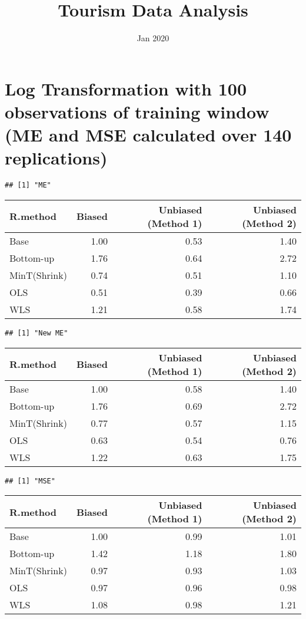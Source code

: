 \documentclass[
]{article}
\title{Tourism Data Analysis}
\author{}
\date{\vspace{-2.5em}Jan 2020}
\begin{document}
\maketitle

\hypertarget{log-transformation-with-100-observations-of-training-window-me-and-mse-calculated-over-140-replications}{%
\section{Log Transformation with 100 observations of training window (ME
and MSE calculated over 140
replications)}\label{log-transformation-with-100-observations-of-training-window-me-and-mse-calculated-over-140-replications}}

\begin{verbatim}
## [1] "ME"
\end{verbatim}

\begin{tabular}{l|r|r|r}
\hline
R.method & Biased & Unbiased (Method 1) & Unbiased (Method 2)\\
\hline
Base & 1.00 & 0.53 & 1.40\\
\hline
Bottom-up & 1.76 & 0.64 & 2.72\\
\hline
MinT(Shrink) & 0.74 & 0.51 & 1.10\\
\hline
OLS & 0.51 & 0.39 & 0.66\\
\hline
WLS & 1.21 & 0.58 & 1.74\\
\hline
\end{tabular}

\begin{verbatim}
## [1] "New ME"
\end{verbatim}

\begin{tabular}{l|r|r|r}
\hline
R.method & Biased & Unbiased (Method 1) & Unbiased (Method 2)\\
\hline
Base & 1.00 & 0.58 & 1.40\\
\hline
Bottom-up & 1.76 & 0.69 & 2.72\\
\hline
MinT(Shrink) & 0.77 & 0.57 & 1.15\\
\hline
OLS & 0.63 & 0.54 & 0.76\\
\hline
WLS & 1.22 & 0.63 & 1.75\\
\hline
\end{tabular}

\begin{verbatim}
## [1] "MSE"
\end{verbatim}

\begin{tabular}{l|r|r|r}
\hline
R.method & Biased & Unbiased (Method 1) & Unbiased (Method 2)\\
\hline
Base & 1.00 & 0.99 & 1.01\\
\hline
Bottom-up & 1.42 & 1.18 & 1.80\\
\hline
MinT(Shrink) & 0.97 & 0.93 & 1.03\\
\hline
OLS & 0.97 & 0.96 & 0.98\\
\hline
WLS & 1.08 & 0.98 & 1.21\\
\hline
\end{tabular}
\end{document}
